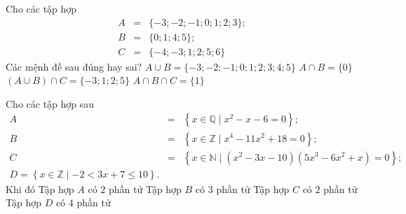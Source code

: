 \begin{ex}%
	Cho các tập hợp 
	\begin{eqnarray*}
		A&=&\{-3 ;-2 ;-1 ; 0 ; 1 ; 2 ; 3\};\\
		B&=&\{0 ; 1 ; 4 ; 5\};\\
		C&=&\{-4 ;-3 ; 1 ; 2 ; 5 ; 6\}
	\end{eqnarray*} Các mệnh đề sau đúng hay sai?
	\choiceTF
	{\True $A\cup B=\{-3 ;-2 ;-1 ; 0 ; 1 ; 2 ; 3 ; 4 ; 5\}$}
	{$A\cap B=\{0\}$}
	{\True $(A\cup B)\cap C=\{-3 ; 1 ; 2 ; 5\}$}
	{\True $A\cap B\cap C=\{1\}$}
\end{ex}

\begin{ex}%
	Cho các tập hợp sau 
	\begin{eqnarray*}
		A&=&\left\{ x\in\mathbb{Q}\mid x^2-x-6=0\right\};\\
		B&=&\left\{ x\in\mathbb{Z}\mid x^4-11x^2+18=0\right\};\\
		C&=&\left\{x\in\mathbb{N}\mid \left(x^2-3x-10\right)\left(5x^3-6x^2+x\right)=0\right\};\\
		D=\left\{ x\in\mathbb{Z}\mid-2<3x+7\le 10\right\}.
	\end{eqnarray*} Khi đó
	\choiceTF
	{Tập hợp $A$ có $2$ phần tử}
	{Tập hợp $B$ có $3$ phần tử}
	{Tập hợp $C$ có $2$ phần tử}
	{Tập hợp $D$ có $4$ phần tử}
\end{ex}

